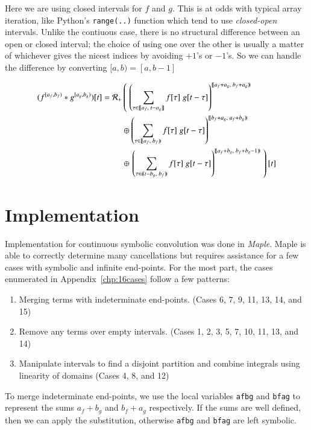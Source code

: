 Here we are using closed intervals for $f$ and $g$.
This is at odds with typical array iteration, like Python's \texttt{range(..)} function which tend to use \emph{closed-open} 
intervals.
Unlike the contiuous case, there is no structural difference between an open or closed interval; the choice of using one over 
the other is usually a matter of whichever gives the nicest indices by avoiding $+1$'s or $-1$'s.
So we can handle the difference by converting $[a,b) = [a,b-1]$


\begin{align}
	(f^{[a_f,b_f)} * g^{[a_g, b_g)})[t] = 
		\R[+] &\left( \; \left( 
			\sum_{\tau \in [\![a_f,\;t-a_g]\!]} f[\tau] \; g[t-\tau] \right)^{[\![a_f+a_g,\; b_f+a_g)\!)} 
				\right. \notag \\ &\oplus \left( 
			\sum_{\tau \in [\![a_f,\;b_f)\!)} f[\tau] \; g[t-\tau] \right)^{[\![b_f+a_g,\; a_f+b_g)\!)} 
				\notag \\ &\oplus \left. \left( 
			\sum_{\tau \in (\!(t-b_g,\;b_f)\!)} f[\tau] \; g[t-\tau] \right)^{[\![a_f+b_g,\; b_f+b_g-1)\!)} 
				\; \right)[t]
\end{align}





%
%
\section{Implementation}

Implementation for continuous symbolic convolution was done in \emph{Maple}.
Maple is able to correctly determine many cancellations but requires assistance for a few cases with symbolic and infinite
end-points.
For the most part, the cases enumerated in Appendix~\ref{chp:16cases} follow a few patterns:
\begin{enumerate}
	\item Merging terms with indeterminate end-points. (Cases 6, 7, 9, 11, 13, 14, and 15)
	\item Remove any terms over empty intervals. (Cases 1, 2, 3, 5, 7, 10, 11, 13, and 14)
	\item Manipulate intervals to find a disjoint partition and combine integrals using linearity of domains 
	(Cases 4, 8, and 12)
\end{enumerate}


To merge indeterminate end-points, we use the local variables \texttt{afbg} and \texttt{bfag} to represent the sums
$a_f+b_g$ and $b_f+a_g$ respectively.
If the sums are well defined, then we can apply the substitution, otherwise \texttt{afbg} and \texttt{bfag} are left symbolic.



